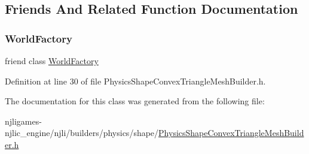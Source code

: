 \subsection{Friends And Related Function Documentation}
\mbox{\label{classnjli_1_1_physics_shape_convex_triangle_mesh_builder_acb96ebb09abe8f2a37a915a842babfac}} 
\subsubsection{\texorpdfstring{World\+Factory}{WorldFactory}}
{\footnotesize\ttfamily friend class \mbox{\hyperlink{classnjli_1_1_world_factory}{World\+Factory}}\hspace{0.3cm}{\ttfamily [friend]}}



Definition at line 30 of file Physics\+Shape\+Convex\+Triangle\+Mesh\+Builder.\+h.



The documentation for this class was generated from the following file\+:\begin{DoxyCompactItemize}
\item 
njligames-\/njlic\+\_\+engine/njli/builders/physics/shape/\mbox{\hyperlink{_physics_shape_convex_triangle_mesh_builder_8h}{Physics\+Shape\+Convex\+Triangle\+Mesh\+Builder.\+h}}\end{DoxyCompactItemize}
